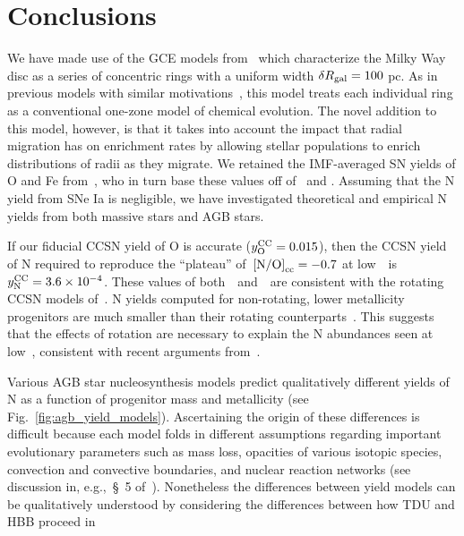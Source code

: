 \documentclass[ms.tex]{subfiles}
\begin{document}
\section{Conclusions}
\label{sec:conclusions}

We have made use of the GCE models from~\citet{Johnson2021} which characterize
the Milky Way disc as a series of concentric rings with a uniform width
$\delta R_\text{gal} = 100$ pc.
As in previous models with similar motivations~\citep{Matteucci1989,
Wyse1989, Prantzos1995, Schoenrich2009, Minchev2013, Minchev2014, Minchev2017,
Sharma2021}, this model treats each individual ring as a conventional one-zone
model of chemical evolution.
The novel addition to this model, however, is that it takes into account the
impact that radial migration has on enrichment rates by allowing stellar
populations to enrich distributions of radii as they migrate.
We retained the IMF-averaged SN yields of O and Fe from~\citet{Johnson2021},
who in turn base these values off of~\citet{Weinberg2017} and
\citet{Johnson2020}.
Assuming that the N yield from SNe Ia is negligible, we have investigated
theoretical and empirical N yields from both massive stars and AGB stars.
\par
If our fiducial CCSN yield of O is accurate ($y_\text{O}^\text{CC} = 0.015$), then the CCSN
yield of N required to reproduce the ``plateau'' of~$\text{[N/O]}_\text{cc} = -0.7$ at
low~\oh~is~$y_\text{N}^\text{CC} = 3.6\times10^{-4}$.
These values of both~~and~\no\subcc~are consistent with the rotating
CCSN models of~\citet{Limongi2018}.
N yields computed for non-rotating, lower metallicity progenitors are much
smaller than their rotating counterparts~\citep[see
Fig.~\ref{fig:n_cc_yields};][]{Woosley1995, Nomoto2013, Sukhbold2016,
Limongi2018}.
This suggests that the effects of rotation are necessary to explain the N
abundances seen at low~\oh, consistent with recent arguments
from~\citet{Grisoni2021}.
\par
Various AGB star nucleosynthesis models predict qualitatively different yields
of N as a function of progenitor mass and metallicity (see
Fig.~\ref{fig:agb_yield_models}).
Ascertaining the origin of these differences is difficult because each model
folds in different assumptions regarding important evolutionary parameters such
as mass loss, opacities of various isotopic species, convection and convective
boundaries, and nuclear reaction networks (see discussion in, e.g.,~\S~5
of~\citealp{Karakas2016}).
Nonetheless the differences between yield models can be qualitatively
understood by considering the differences between how TDU and HBB proceed in
\end{document}
